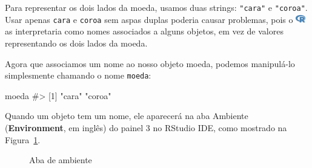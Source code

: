 \documentclass[
  letterpaper,
]{book}
\newenvironment{Shaded}{\begin{snugshade}}{\end{snugshade}}
\newcommand{\CommentTok}[1]{\textcolor[rgb]{0.37,0.37,0.37}{#1}}
\newcommand{\NormalTok}[1]{\textcolor[rgb]{0.00,0.23,0.31}{#1}}
\theoremstyle{definition}
\theoremstyle{plain}
\theoremstyle{remark}
\begin{document}
\begin{tcolorbox}[enhanced jigsaw, colback=white, bottomrule=.15mm, colframe=quarto-callout-note-color-frame, rightrule=.15mm, opacityback=0, toptitle=1mm, arc=.35mm, toprule=.15mm, bottomtitle=1mm, titlerule=0mm, opacitybacktitle=0.6, leftrule=.75mm, colbacktitle=quarto-callout-note-color!10!white, coltitle=black, title=\textcolor{quarto-callout-note-color}{\faInfo}\hspace{0.5em}{Nota}, breakable, left=2mm]

Para representar os dois lados da moeda, usamos duas strings:
\texttt{"cara"} e \texttt{"coroa"}. Usar apenas \texttt{cara} e
\texttt{coroa} sem aspas duplas poderia causar problemas, pois o
\includegraphics[width=1.13em,height=1em]{getting_started_with_r_files/figure-pdf/fa-icon-9b00320707d42527dde67262afb33ded.pdf}
as interpretaria como nomes associados a alguns objetos, em vez de
valores representando os dois lados da moeda.

\end{tcolorbox}

Agora que associamos um nome ao nosso objeto moeda, podemos manipulá-lo
simplesmente chamando o nome \texttt{moeda}:

\begin{Shaded}
\begin{Highlighting}[]
\NormalTok{moeda}
\CommentTok{\#\textgreater{} [1] "cara"  "coroa"}
\end{Highlighting}
\end{Shaded}

Quando um objeto tem um nome, ele aparecerá na aba Ambiente
(\textbf{Environment}, em inglês) do painel 3 no RStudio IDE, como
mostrado na Figura~\ref{fig-panel3-environment-tab}.

\begin{figure}


\caption{\label{fig-panel3-environment-tab}Aba de ambiente}

\end{figure}%
\end{document}
